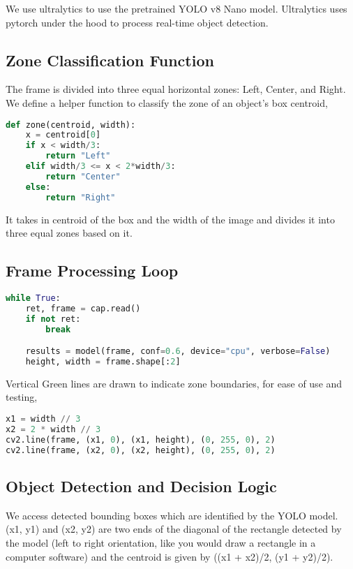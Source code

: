 \documentclass[12pt]{article}
\begin{document}
We use ultralytics to use the pretrained YOLO v8 Nano model. Ultralytics uses pytorch under the hood to process real-time object detection.

\subsection*{Zone Classification Function}
The frame is divided into three equal horizontal zones: Left, Center, and Right. We define a helper function to classify the zone of an object's box centroid,

\begin{lstlisting}[language=Python]
def zone(centroid, width):
    x = centroid[0]
    if x < width/3:
        return "Left"
    elif width/3 <= x < 2*width/3:
        return "Center"
    else:
        return "Right"
\end{lstlisting}

It takes in centroid of the box and the width of the image and divides it into three equal zones based on it.

\subsection*{Frame Processing Loop}

\begin{lstlisting}[language=Python]
while True:
    ret, frame = cap.read()
    if not ret:
        break

    results = model(frame, conf=0.6, device="cpu", verbose=False)
    height, width = frame.shape[:2]

\end{lstlisting}

Vertical Green lines are drawn to indicate zone boundaries, for ease of use and testing,

\begin{lstlisting}[language=Python]
x1 = width // 3
x2 = 2 * width // 3
cv2.line(frame, (x1, 0), (x1, height), (0, 255, 0), 2)
cv2.line(frame, (x2, 0), (x2, height), (0, 255, 0), 2)
\end{lstlisting}

\subsection*{Object Detection and Decision Logic}
We access detected bounding boxes which are identified by the YOLO model. (x1, y1) and (x2, y2) are two ends of the diagonal of the rectangle detected by the model (left to right orientation, like you would draw a rectangle in a computer software) and the centroid is given by ((x1 + x2)/2, (y1 + y2)/2).
\end{document}
